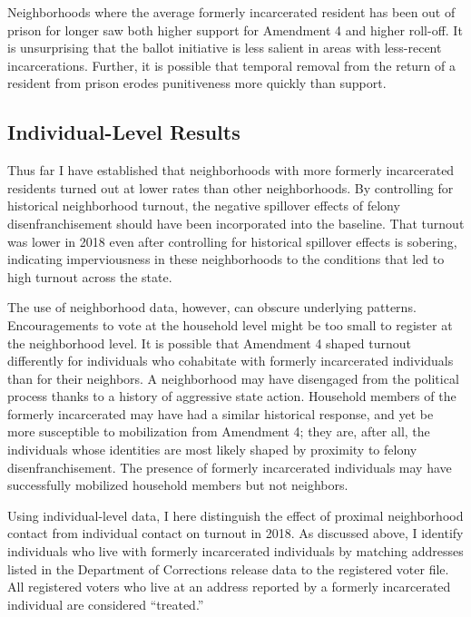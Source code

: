 \documentclass[
  12pt,
]{article}
\begin{document}
Neighborhoods where the average formerly incarcerated resident has been out of prison for longer saw both higher support for Amendment 4 and higher roll-off. It is unsurprising that the ballot initiative is less salient in areas with less-recent incarcerations. Further, it is possible that temporal removal from the return of a resident from prison erodes punitiveness more quickly than support.

\hypertarget{individual-level-results}{%
\subsection*{Individual-Level Results}\label{individual-level-results}}

Thus far I have established that neighborhoods with more formerly incarcerated residents turned out at lower rates than other neighborhoods. By controlling for historical neighborhood turnout, the negative spillover effects of felony disenfranchisement should have been incorporated into the baseline. That turnout was lower in 2018 even after controlling for historical spillover effects is sobering, indicating imperviousness in these neighborhoods to the conditions that led to high turnout across the state.

The use of neighborhood data, however, can obscure underlying patterns. Encouragements to vote at the household level might be too small to register at the neighborhood level. It is possible that Amendment 4 shaped turnout differently for individuals who cohabitate with formerly incarcerated individuals than for their neighbors. A neighborhood may have disengaged from the political process thanks to a history of aggressive state action. Household members of the formerly incarcerated may have had a similar historical response, and yet be more susceptible to mobilization from Amendment 4; they are, after all, the individuals whose identities are most likely shaped by proximity to felony disenfranchisement. The presence of formerly incarcerated individuals may have successfully mobilized household members but not neighbors.

Using individual-level data, I here distinguish the effect of proximal neighborhood contact from individual contact on turnout in 2018. As discussed above, I identify individuals who live with formerly incarcerated individuals by matching addresses listed in the Department of Corrections release data to the registered voter file. All registered voters who live at an address reported by a formerly incarcerated individual are considered ``treated.''
\end{document}

